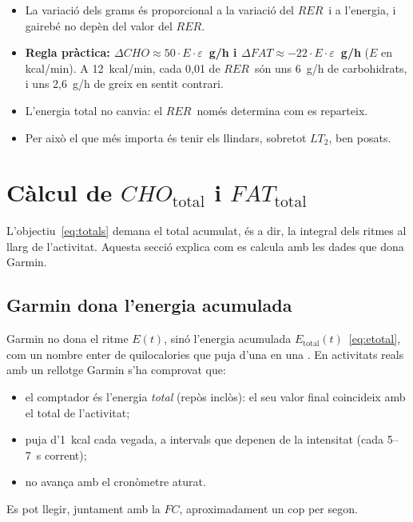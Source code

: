 \documentclass[10pt,a4paper]{article}
\newcommand{\sub}[1]{{\scriptscriptstyle\mathrm{#1}}}   %
\newcommand{\tot}{\sub{total}}
\newcommand{\cho}{\ensuremath{\mathit{CHO}}}               %
\newcommand{\fat}{\ensuremath{\mathit{FAT}}}
\newcommand{\RER}{\ensuremath{\mathit{RER}}}
\newcommand{\FC}{\ensuremath{\mathit{FC}}}
\begin{document}
\begin{conclusio}
\begin{itemize}[leftmargin=*]
  \item La variació dels grams és proporcional a la variació del \RER\ i a l'energia, i
        gairebé no depèn del valor del \RER.
  \item \textbf{Regla pràctica: $\Delta\cho\approx50\cdot E\cdot\varepsilon$~g/h i
        $\Delta\fat\approx-22\cdot E\cdot\varepsilon$~g/h} ($E$ en kcal/min). A 12~kcal/min,
        cada 0,01 de \RER\ són uns 6~g/h de carbohidrats, i uns 2,6~g/h de greix en sentit
        contrari.
  \item L'energia total no canvia: el \RER\ només determina com es reparteix.
  \item Per això el que més importa és tenir els llindars, sobretot $LT_2$, ben posats.
\end{itemize}
\end{conclusio}

\section{Càlcul de \texorpdfstring{$\mathit{CHO}_{\mathrm{total}}$ i $\mathit{FAT}_{\mathrm{total}}$}{CHO total i FAT total}}\label{sec:total}

L'objectiu~\eqref{eq:totals} demana el total acumulat, és a dir, la integral dels ritmes al
llarg de l'activitat. Aquesta secció explica com es calcula amb les dades que dona Garmin.

\subsection{Garmin dona l'energia acumulada}
Garmin no dona el ritme $E(t)$, sinó l'energia acumulada $E_{\tot}(t)$~\eqref{eq:etotal},
com un nombre enter de quilocalories que puja d'una en una \citep{garminciq}. En activitats
reals amb un rellotge Garmin s'ha comprovat que:
\begin{itemize}
  \item el comptador és l'energia \emph{total} (repòs inclòs): el seu valor final coincideix
        amb el total de l'activitat;
  \item puja d'1~kcal cada vegada, a intervals que depenen de la intensitat (cada
        5--7~s corrent);
  \item no avança amb el cronòmetre aturat.
\end{itemize}
Es pot llegir, juntament amb la \FC, aproximadament un cop per segon.
\end{document}

